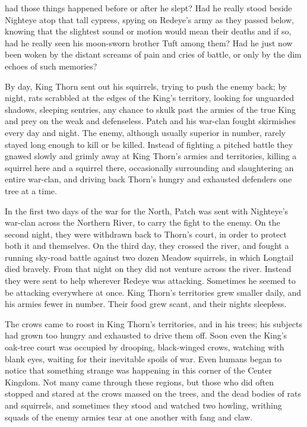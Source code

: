 \documentclass[11pt]{article}
\begin{document}
 had those things happened before or after he slept? Had he really stood beside Nighteye atop that tall cypress, spying on Redeye's army as they passed below, knowing that the slightest sound or motion would mean their deaths %
 and if so, had he really seen his moon-sworn brother Tuft among them? Had he just now been woken by the distant screams of pain and cries of battle, or only by the dim echoes of such memories?\par
 By day, King Thorn sent out his squirrels, trying to push the enemy back; by night, rats scrabbled at the edges of the King's territory, looking for unguarded shadows, sleeping sentries, any chance to skulk past the armies of the true King and prey on the weak and defenseless. Patch and his war-clan fought skirmishes every day and night. The enemy, although usually superior in number, rarely stayed long enough to kill or be killed. Instead of fighting a pitched battle they gnawed slowly and grimly away at King Thorn's armies and territories, killing a squirrel here and a squirrel there, occasionally surrounding and slaughtering an entire war-clan, and driving back Thorn's hungry and exhausted defenders one tree at a time.\par
 In the first two days of the war for the North, Patch was sent with Nighteye's war-clan across the Northern River, to carry the fight to the enemy. On the second night, they were withdrawn back to Thorn's court, in order to protect both it and themselves. On the third day, they crossed the river, and fought a running sky-road battle against two dozen Meadow squirrels, in which Longtail died bravely. From that night on they did not venture across the river. Instead they were sent to help wherever Redeye was attacking. Sometimes he seemed to be attacking everywhere at once. King Thorn's territories grew smaller daily, and his armies fewer in number. Their food grew scant, and their nights sleepless.\par
 The crows came to roost in King Thorn's territories, and in his trees; his subjects had grown too hungry and exhausted to drive them off. Soon even the King's oak-tree court was occupied by drooping, black-winged crows, watching with blank eyes, waiting for their inevitable spoils of war. Even humans began to notice that something strange was happening in this corner of the Center Kingdom. Not many came through these regions, but those who did often stopped and stared at the crows massed on the trees, and the dead bodies of rats and squirrels, and sometimes they stood and watched two howling, writhing squads of the enemy armies tear at one another with fang and claw.\par
\end{document}
